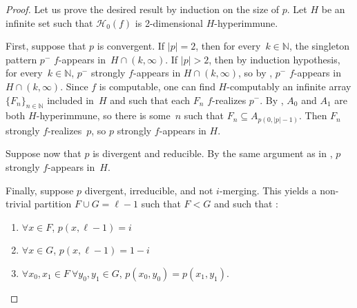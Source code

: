 \documentclass{article}
\def\Hc{\mathcal{H}}
\newcommand{\uh}{\upharpoonright}
\newcommand{\NN}[0]{\mathbb{N}}
\newcommand{\card}{\operatorname{card}}
\def\NN{\mathbb{N}}
\def\Hc{\mathcal{H}}
\numberwithin{theorem}{section}
\theoremstyle{definition}
\begin{document}
\begin{proof}
    Let us prove the desired result by induction on the size of $p$. Let $H$ be an infinite set such that $\Hc_0(f)$ is 2-dimensional $H$-hyperimmune.

      
    First, suppose that $p$ is convergent. If $|p| = 2$, then for every~$k \in \NN$, the singleton pattern $p^-$ $f$-appears in~$H \cap (k, \infty)$. If $|p| > 2$, then by induction hypothesis, for every~$k \in \NN$, $p^-$ strongly $f$-appears in $H \cap (k, \infty)$, so by , $p^-$ $f$-appears in $H \cap (k, \infty)$. Since $f$ is computable, one can find $H$-computably an infinite array $\{F_n\}_{n\in \NN}$ included in~$H$ and such that each $F_n$ $f$-realizes $p^-$. 
    By , $A_0$ and $A_1$ are both $H$-hyperimmune, so there is some~$n$ such that $F_n \subseteq A_{p(0,|p|-1)}$. Then $F_n$ strongly $f$-realizes~$p$, so $p$ strongly $f$-appears in $H$.

    Suppose now that $p$ is divergent and reducible. By the same argument as in , $p$ strongly $f$-appears in~$H$. %
    

    Finally, suppose $p$ divergent, irreducible, and not $i$-merging. This yields a non-trivial partition $F \cup G = \ell-1$ such that $F < G$ and such that :
 \begin{enumerate}
    \item $\forall x \in F$, $p(x, \ell-1) = i$
    \item $\forall x\in G$, $p(x, \ell-1) = 1-i$
    \item $\forall x_0,x_1 \in F\ \forall y_0, y_1 \in G$, $p(x_0, y_0) = p(x_1, y_1)$.
\end{enumerate}


\end{proof}
\end{document}
